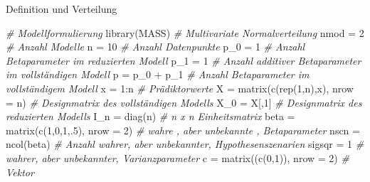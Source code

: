 \documentclass[
  8pt,
  ignorenonframetext,
]{beamer}
\newenvironment{Shaded}{\begin{snugshade}}{\end{snugshade}}
\newcommand{\AttributeTok}[1]{\textcolor[rgb]{0.77,0.63,0.00}{#1}}
\newcommand{\CommentTok}[1]{\textcolor[rgb]{0.56,0.35,0.01}{\textit{#1}}}
\newcommand{\DecValTok}[1]{\textcolor[rgb]{0.00,0.00,0.81}{#1}}
\newcommand{\FunctionTok}[1]{\textcolor[rgb]{0.00,0.00,0.00}{#1}}
\newcommand{\NormalTok}[1]{#1}
\newcommand{\OtherTok}[1]{\textcolor[rgb]{0.56,0.35,0.01}{#1}}
\newcommand{\SpecialCharTok}[1]{\textcolor[rgb]{0.00,0.00,0.00}{#1}}
\begin{document}
\begin{frame}[fragile]{Definition und Verteilung}
\begin{Shaded}
\begin{Highlighting}[]
\CommentTok{\# Modellformulierung}
\FunctionTok{library}\NormalTok{(MASS)                                               }\CommentTok{\# Multivariate Normalverteilung}
\NormalTok{nmod   }\OtherTok{=} \DecValTok{2}                                                  \CommentTok{\# Anzahl Modelle}
\NormalTok{n      }\OtherTok{=} \DecValTok{10}                                                 \CommentTok{\# Anzahl Datenpunkte}
\NormalTok{p\_0    }\OtherTok{=} \DecValTok{1}                                                  \CommentTok{\# Anzahl Betaparameter im reduzierten Modell}
\NormalTok{p\_1    }\OtherTok{=} \DecValTok{1}                                                  \CommentTok{\# Anzahl additiver Betaparameter im vollständigen Modell}
\NormalTok{p      }\OtherTok{=}\NormalTok{ p\_0 }\SpecialCharTok{+}\NormalTok{ p\_1                                          }\CommentTok{\# Anzahl Betaparameter im vollständigem Modell}
\NormalTok{x      }\OtherTok{=} \DecValTok{1}\SpecialCharTok{:}\NormalTok{n                                                }\CommentTok{\# Prädiktorwerte}
\NormalTok{X      }\OtherTok{=} \FunctionTok{matrix}\NormalTok{(}\FunctionTok{c}\NormalTok{(}\FunctionTok{rep}\NormalTok{(}\DecValTok{1}\NormalTok{,n),x), }\AttributeTok{nrow =}\NormalTok{ n)                    }\CommentTok{\# Designmatrix des vollständigen Modells}
\NormalTok{X\_0    }\OtherTok{=}\NormalTok{ X[,}\DecValTok{1}\NormalTok{]                                              }\CommentTok{\# Designmatrix des reduzierten Modells}
\NormalTok{I\_n    }\OtherTok{=} \FunctionTok{diag}\NormalTok{(n)                                            }\CommentTok{\# n x n Einheitsmatrix}
\NormalTok{beta   }\OtherTok{=} \FunctionTok{matrix}\NormalTok{(}\FunctionTok{c}\NormalTok{(}\DecValTok{1}\NormalTok{,}\DecValTok{0}\NormalTok{,}\DecValTok{1}\NormalTok{,.}\DecValTok{5}\NormalTok{), }\AttributeTok{nrow =} \DecValTok{2}\NormalTok{)                      }\CommentTok{\# wahre , aber unbekannte , Betaparameter}
\NormalTok{nscn   }\OtherTok{=} \FunctionTok{ncol}\NormalTok{(beta)                                         }\CommentTok{\# Anzahl wahrer, aber unbekannter, Hypothesenszenarien}
\NormalTok{sigsqr }\OtherTok{=} \DecValTok{1}                                                  \CommentTok{\# wahrer, aber unbekannter, Varianzparameter}
\NormalTok{c      }\OtherTok{=} \FunctionTok{matrix}\NormalTok{((}\FunctionTok{c}\NormalTok{(}\DecValTok{0}\NormalTok{,}\DecValTok{1}\NormalTok{)), }\AttributeTok{nrow =} \DecValTok{2}\NormalTok{)                         }\CommentTok{\# Vektor  }


\end{Highlighting}
\end{Shaded}
\end{frame}
\end{document}
